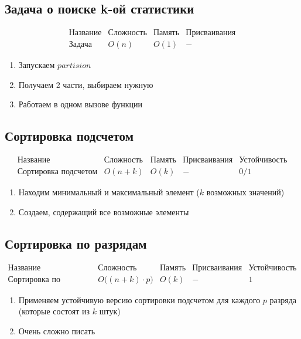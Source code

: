\subsection{Задача о поиске k-ой статистики}

$$\begin{array}{c|c|c|c}
    \text{Название} & \text{Сложность} & \text{Память} & \text{Присваивания} \\
    \hline
    \text{Задача} & O(n) & O(1) & -
\end{array}$$

\begin{enumerate}
    \item Запускаем $partision$
    \item Получаем 2 части, выбираем нужную
    \item Работаем в одном вызове функции
\end{enumerate}


\subsection{Сортировка подсчетом}

$$\begin{array}{c|c|c|c|c}
    \text{Название} & \text{Сложность} & \text{Память} & \text{Присваивания} & \text{Устойчивость} \\
    \hline
    \text{Сортировка подсчетом} & O(n + k) & O(k) & - & 0 / 1
\end{array}$$

\begin{enumerate}
    \item Находим минимальный и максимальный элемент ($k$ возможных значений)
    \item Создаем, содержащий все возможные элементы
\end{enumerate}


\subsection{Сортировка по разрядам}

$$\begin{array}{c|c|c|c|c}
    \text{Название} & \text{Сложность} & \text{Память} & \text{Присваивания} & \text{Устойчивость} \\
    \hline
    \text{Сортировка по разрядам} & O\big((n + k) \cdot p\big) & O(k) & - & 1
\end{array}$$

\begin{enumerate}
    \item Применяем устойчивую версию сортировки подсчетом для каждого $p$ разряда (которые состоят из $k$ штук)
    \item Очень сложно писать
\end{enumerate}


